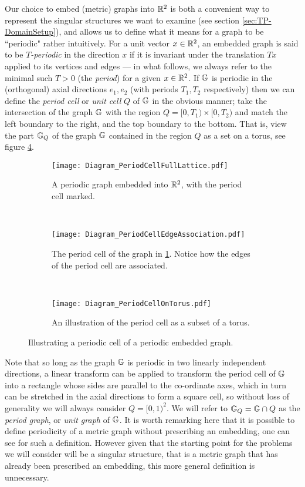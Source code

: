 Our choice to embed (metric) graphs into $\mathbb{R}^2$ is both a convenient way to represent the singular structures we want to examine (see section \ref{sec:TP-DomainSetup}), and allows us to define what it means for a graph to be ``periodic" rather intuitively.
For a unit vector $x\in\mathbb{R}^2$, an embedded graph is said to be \emph{$T$-periodic} in the direction $x$ if it is invariant under the translation $Tx$ applied to its vertices and edges --- in what follows, we always refer to the minimal such $T>0$ (the \emph{period}) for a given $x\in\mathbb{R}^2$.
If $\mathbb{G}$ is periodic in the (orthogonal) axial directions $e_1, e_2$ (with periods $T_1, T_2$ respectively) then we can define the \emph{period cell} or \emph{unit cell} $Q$ of $\mathbb{G}$ in the obvious manner; take the intersection of the graph $\mathbb{G}$ with the region $Q = [0,T_1)\times [0,T_2)$ and match the left boundary to the right, and the top boundary to the bottom.
That is, view the part $\mathbb{G}_{Q}$ of the graph $\mathbb{G}$ contained in the region $Q$ as a set on a torus, see figure \ref{fig:PeriodCellIllustration}.
\begin{figure}[t!]
	\centering
	\begin{subfigure}[t]{0.45\textwidth}
		\centering
		\texttt{[image: Diagram\_PeriodCellFullLattice.pdf]}
		\caption{\label{fig:Diagram_PeriodCellFullLattice} A periodic graph embedded into $\mathbb{R}^2$, with the period cell marked.}
	\end{subfigure}
	~
	\begin{subfigure}[t]{0.45\textwidth}
		\centering
		\texttt{[image: Diagram\_PeriodCellEdgeAssociation.pdf]}
		\caption{\label{fig:Diagram_PeriodCellEdgeAssociation} The period cell of the graph in \ref{fig:Diagram_PeriodCellFullLattice}. Notice how the edges of the period cell are associated.}
	\end{subfigure}
	\\
	\begin{subfigure}[b]{0.75\textwidth}
		\centering
		\texttt{[image: Diagram\_PeriodCellOnTorus.pdf]}
		\caption{\label{fig:Diagram_PeriodCellOnTorus} An illustration of the period cell as a subset of a torus.}
	\end{subfigure}
	\caption{\label{fig:PeriodCellIllustration} Illustrating a periodic cell of a periodic embedded graph.}
\end{figure} 
Note that so long as the graph $\mathbb{G}$ is periodic in two linearly independent directions, a linear transform can be applied to transform the period cell of $\mathbb{G}$ into a rectangle whose sides are parallel to the co-ordinate axes, which in turn can be stretched in the axial directions to form a square cell, so without loss of generality we will always consider $Q=[0,1)^2$.
We will refer to $\mathbb{G}_{Q} = \mathbb{G} \cap Q$ as the \emph{period graph}, or \emph{unit graph} of $\mathbb{G}$.
It is worth remarking here that it is possible to define periodicity of a metric graph without prescribing an embedding, one can see \cite[Chapter~4]{berkolaiko2013introduction} for such a definition.
However given that the starting point for the problems we will consider will be a singular structure, that is a metric graph that has already been prescribed an embedding, this more general definition is unnecessary.

